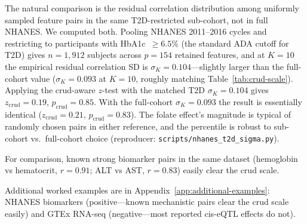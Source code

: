 The natural comparison is the residual correlation distribution among uniformly sampled feature pairs in the same T2D-restricted sub-cohort, not in full NHANES. We computed both. Pooling NHANES 2011--2016 cycles and restricting to participants with HbA1c~$\ge 6.5\%$ (the standard ADA cutoff for T2D) gives $n=1{,}912$ subjects across $p=154$ retained features, and at $K=10$ the empirical residual correlation SD is $\sigma_K=0.104$---slightly larger than the full-cohort value ($\sigma_K=0.093$ at $K=10$, roughly matching Table~\ref{tab:crud-scale}). Applying the crud-aware $z$-test with the matched T2D $\sigma_K=0.104$ gives $z_{\mathrm{crud}}=0.19$, $p_{\mathrm{crud}}=0.85$. With the full-cohort $\sigma_K=0.093$ the result is essentially identical ($z_{\mathrm{crud}}=0.21$, $p_{\mathrm{crud}}=0.83$). The folate effect's magnitude is typical of randomly chosen pairs in either reference, and the percentile is robust to sub-cohort vs.\ full-cohort choice (reproducer: \texttt{scripts/nhanes\_t2d\_sigma.py}).

For comparison, known strong biomarker pairs in the same dataset (hemoglobin vs hematocrit, $r=0.91$; ALT vs AST, $r=0.83$) easily clear the crud scale.

Additional worked examples are in Appendix~\ref{app:additional-examples}: NHANES biomarkers (positive---known mechanistic pairs clear the crud scale easily) and GTEx RNA-seq (negative---most reported cis-eQTL effects do not).
